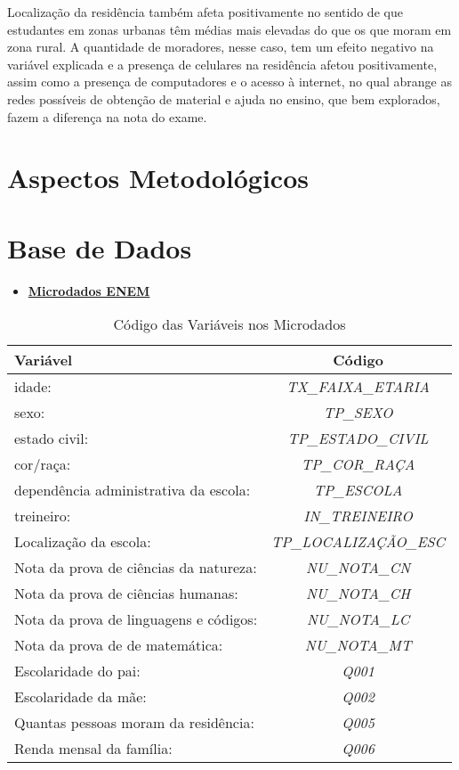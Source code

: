 \documentclass[tcc1,project]{uftex}
\begin{document}
Localização da residência também afeta positivamente no sentido de que estudantes em zonas urbanas têm médias mais elevadas do que os que moram em zona rural. A quantidade de moradores, nesse caso, tem um efeito negativo na variável explicada e a presença de celulares na residência afetou positivamente, assim como a presença de computadores e o acesso à internet, no qual abrange as redes possíveis de obtenção de material e ajuda no ensino, que bem explorados, fazem a diferença na nota do exame. \\  


 
 
\section*{Aspectos Metodológicos}


\section*{Base de Dados}

\begin{itemize}

\item \textbf{\href{https://www.gov.br/inep/pt-br/acesso-a-informacao/dados-abertos/microdados/enem}{Microdados ENEM}}

\end{itemize}

\begin{table}[h]
\centering
\caption{Código das Variáveis nos Microdados}
\begin{tabular}{lc}
\hline\hline
\textbf{Variável} & \textbf{Código} \\
\hline\hline
idade: & \textit{TX\_FAIXA\_ETARIA} \\
sexo: & \textit{TP\_SEXO} \\
estado civil: & \textit{TP\_ESTADO\_CIVIL} \\
cor/raça: & \textit{TP\_COR\_RAÇA} \\
dependência administrativa da escola: & \textit{TP\_ESCOLA} \\
treineiro: & \textit{IN\_TREINEIRO} \\
Localização da escola: & \textit{TP\_LOCALIZAÇÃO\_ESC} \\
Nota da prova de ciências da natureza: & \textit{NU\_NOTA\_CN} \\
Nota da prova de ciências humanas: & \textit{NU\_NOTA\_CH} \\
Nota da prova de linguagens e códigos: & \textit{NU\_NOTA\_LC} \\
Nota da prova de de matemática: & \textit{NU\_NOTA\_MT} \\
Escolaridade do pai: & \textit{Q001} \\
Escolaridade da mãe: & \textit{Q002} \\
Quantas pessoas moram da residência: & \textit{Q005} \\
Renda mensal da família: & \textit{Q006} \\
\hline
\end{tabular}
\label{Observação: Todas estão condicionadas à variável da UF do Tocantins SG\_UF\_ESC}
\end{table}
\end{document}
